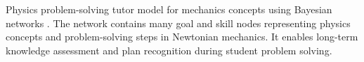 Physics problem-solving tutor model for mechanics concepts using Bayesian networks \cite{conati2002}. The network contains many goal and skill nodes representing physics concepts and problem-solving steps in Newtonian mechanics. It enables long-term knowledge assessment and plan recognition during student problem solving.
